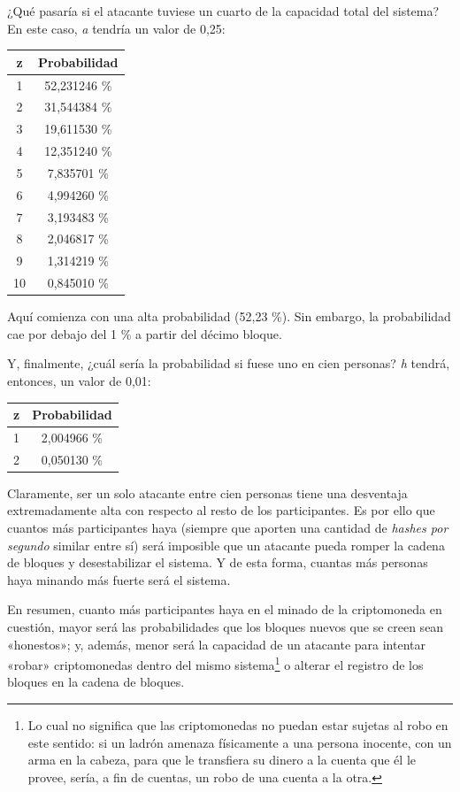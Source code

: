 \documentclass[12pt,a4paper,twoside]{book}
\begin{document}
¿Qué pasaría si el atacante tuviese un cuarto de la capacidad total del sistema? En este caso, \textit{a} tendría un valor de 0,25:

\begin{center}
\begin{longtable}{|c|c|}
\hline 
\textbf{z} & \textbf{Probabilidad} \\ 
\hline 
1 & 52,231246 \% \\ 
\hline 
2 & 31,544384 \% \\ 
\hline 
3 & 19,611530 \% \\ 
\hline 
4 & 12,351240 \% \\ 
\hline 
5 & 7,835701 \% \\ 
\hline 
6 & 4,994260 \% \\ 
\hline 
7 & 3,193483 \% \\ 
\hline 
8 & 2,046817 \% \\ 
\hline 
9 & 1,314219 \% \\ 
\hline 
10 & 0,845010 \% \\ 
\hline 
\end{longtable} 
\end{center}

Aquí comienza con una alta probabilidad (52,23 \%). Sin embargo, la probabilidad cae por debajo del 1 \% a partir del décimo bloque.

Y, finalmente, ¿cuál sería la probabilidad si fuese uno en cien personas? \textit{h} tendrá, entonces, un valor de 0,01:

\begin{center}
\begin{longtable}{|c|c|}
\hline 
\textbf{z} & \textbf{Probabilidad} \\ 
\hline 
1 & 2,004966 \% \\ 
\hline 
2 & 0,050130 \% \\ 
\hline 
\end{longtable} 
\end{center}

Claramente, ser un solo atacante entre cien personas tiene una desventaja extremadamente alta con respecto al resto de los participantes. Es por ello que cuantos más participantes haya (siempre que aporten una cantidad de \textit{hashes por segundo} similar entre sí) será imposible que un atacante pueda romper la cadena de bloques y desestabilizar el sistema. Y de esta forma, cuantas más personas haya minando más fuerte será el sistema.

En resumen, cuanto más participantes haya en el minado de la criptomoneda en cuestión, mayor será las probabilidades que los bloques nuevos que se creen sean «honestos»; y, además, menor será la capacidad de un atacante para intentar «robar» criptomonedas dentro del mismo sistema\footnote{Lo cual no significa que las criptomonedas no puedan estar sujetas al robo en este sentido: si un ladrón amenaza físicamente a una persona inocente, con un arma en la cabeza, para que le transfiera su dinero a la cuenta que él le provee, sería, a fin de cuentas, un robo de una cuenta a la otra.} o alterar el registro de los bloques en la cadena de bloques.
\end{document}
